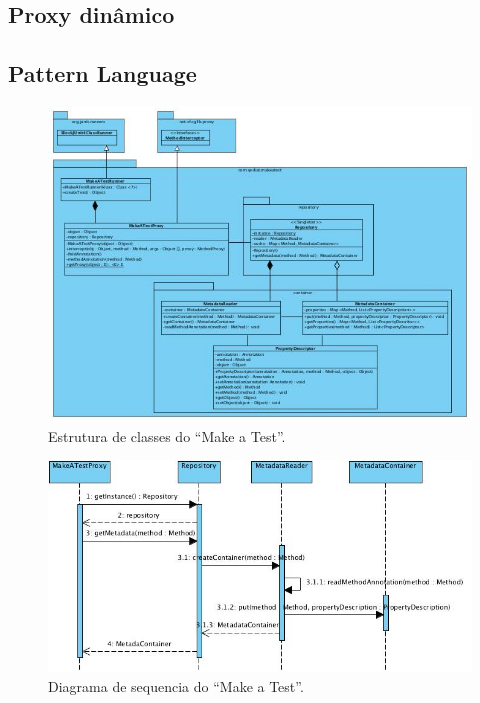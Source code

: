 \documentclass{abnt}
\begin{document}
\subsection{Proxy dinâmico}

\subsection{Pattern Language}

\begin{figure}[!ht]
	\centering
	\includegraphics[scale=0.70]{uml/makeatest.jpg}
	\caption{Estrutura de classes do ``Make a Test''.}
	\label{uml-class-makeatest}
\end{figure}

\begin{figure}[!ht]
	\centering
	\includegraphics[scale=0.70]{uml/sequence-makeatest.jpg}
	\caption{Diagrama de sequencia do ``Make a Test''.}
	\label{uml-sequence-makeatest}
\end{figure}
\end{document}
